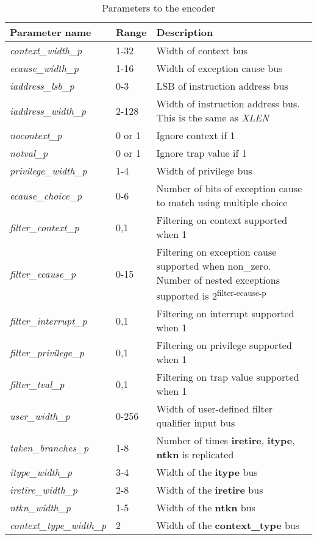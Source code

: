 \FloatBarrier
\begin{table}[h]
    \centering
    \caption{Parameters to the encoder}
    \label{tab:parameters}
    \begin{tabulary}{\textwidth}{|l|p{25mm}|p{80mm}|}
        \hline
        \textbf {Parameter name} & \textbf {Range} & \textbf {Description} \\
        \hline
        \textit {context\_width\_p} & 1-32 & Width of context bus \\
        \hline
        \textit {ecause\_width\_p} & 1-16 & Width of exception cause bus \\
        \hline
        \textit {iaddress\_lsb\_p} & 0-3 & LSB of instruction address bus \\
        \hline
        \textit {iaddress\_width\_p} & 2-128 & Width of instruction address bus. This is the same as \textit {XLEN}\\
        \hline
        \textit {nocontext\_p} & 0 or 1 & Ignore context if 1 \\
        \hline
        \textit {notval\_p} & 0 or 1 & Ignore trap value if 1 \\
        \hline
        \textit {privilege\_width\_p} & 1-4 & Width of privilege bus \\
        \hline
        \textit {ecause\_choice\_p} & 0-6 & Number of bits of exception cause to match using multiple choice \\
        \hline
        \textit {filter\_context\_p} & 0,1 & Filtering on context supported when 1 \\
        \hline
        \textit {filter\_ecause\_p} & 0-15 & Filtering on exception cause supported when non\_zero.  Number of nested exceptions supported is 2\textsuperscript{filter-ecause-p} \\
        \hline
        \textit {filter\_interrupt\_p} & 0,1 & Filtering on interrupt supported when 1 \\
        \hline
        \textit {filter\_privilege\_p} & 0,1 & Filtering on privilege supported when 1 \\
        \hline
        \textit {filter\_tval\_p} & 0,1 & Filtering on trap value supported when 1 \\
        \hline
        \textit {user\_width\_p} & 0-256 & Width of user-defined filter qualifier input bus \\
        \hline
        \textit {taken\_branches\_p} & 1-8 & Number of times \textbf{iretire}, \textbf{itype}, \textbf{ntkn} is replicated\\
        \hline
        \textit {itype\_width\_p} & 3-4 & Width of the \textbf{itype} bus\\
        \hline
        \textit {iretire\_width\_p} & 2-8 & Width of the \textbf{iretire} bus\\
        \hline
        \textit {ntkn\_width\_p} & 1-5 & Width of the \textbf{ntkn} bus\\
        \hline
        \textit {context\_type\_width\_p} & 2 & Width of the \textbf{context\_type} bus\\
        \hline
    \end{tabulary}
\end{table}
\FloatBarrier

